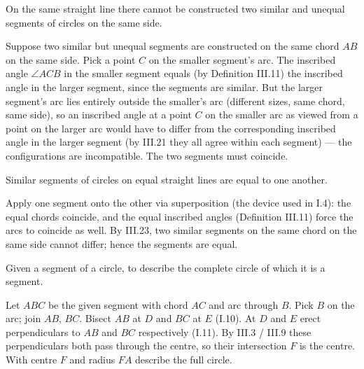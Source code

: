 \begin{claim}
\label{prop:III.23}
On the same straight line there cannot be constructed two similar
and unequal segments of circles on the same side.
\end{claim}
\begin{evidence}
\label{ev:III.23}
Suppose two similar but unequal segments are constructed on the
same chord $AB$ on the same side.  Pick a point $C$ on the smaller
segment's arc.  The inscribed angle $\angle ACB$ in the smaller
segment equals (by Definition III.11) the inscribed angle in the
larger segment, since the segments are similar.  But the larger
segment's arc lies entirely outside the smaller's arc (different
sizes, same chord, same side), so an inscribed angle at a point
$C$ on the smaller arc as viewed from a point on the larger arc
would have to differ from the corresponding inscribed angle in the
larger segment (by III.21 they all agree within each segment) ---
the configurations are incompatible.  The two segments must
coincide.
\end{evidence}

\begin{claim}
\label{prop:III.24}
Similar segments of circles on equal straight lines are equal to one
another.
\end{claim}
\begin{evidence}
\label{ev:III.24}
Apply one segment onto the other via superposition (the device used
in I.4): the equal chords coincide, and the equal inscribed angles
(Definition III.11) force the arcs to coincide as well.  By III.23,
two similar segments on the same chord on the same side cannot
differ; hence the segments are equal.
\end{evidence}

\begin{claim}
\label{prop:III.25}
Given a segment of a circle, to describe the complete circle of
which it is a segment.
\end{claim}
\begin{evidence}
\label{ev:III.25}
Let $ABC$ be the given segment with chord $AC$ and arc through $B$.
Pick $B$ on the arc; join $AB$, $BC$.  Bisect $AB$ at $D$ and $BC$
at $E$ (I.10).  At $D$ and $E$ erect perpendiculars to $AB$ and
$BC$ respectively (I.11).  By III.3 / III.9 these perpendiculars
both pass through the centre, so their intersection $F$ is the
centre.  With centre $F$ and radius $FA$ describe the full circle.
\end{evidence}

